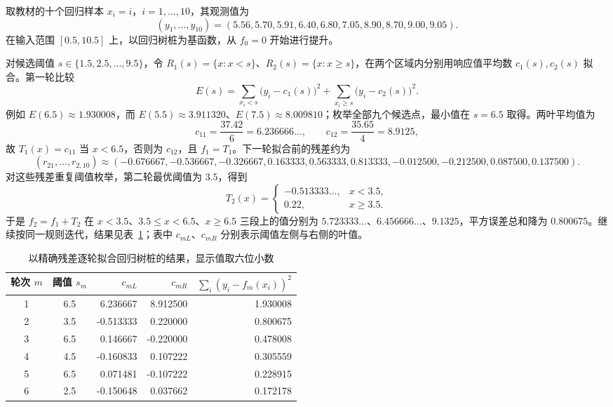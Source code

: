 \begin{example}
\label{ex:lh-boost-regression}
取教材的十个回归样本 $x_i=i$，$i=1,\ldots,10$，其观测值为
\[
 (y_1,\ldots,y_{10})=(5.56,5.70,5.91,6.40,6.80,7.05,8.90,8.70,9.00,9.05).
\]
在输入范围 $[0.5,10.5]$ 上，以回归树桩为基函数，从 $f_0=0$ 开始进行提升。
\end{example}
\begin{solve}
对候选阈值 $s\in\{1.5,2.5,\ldots,9.5\}$，令 $R_1(s)=\{x:x<s\}$、$R_2(s)=\{x:x\geq s\}$，在两个区域内分别用响应值平均数 $c_1(s),c_2(s)$ 拟合。第一轮比较
\[
 E(s)=\sum_{x_i<s}\bigl(y_i-c_1(s)\bigr)^2
      +\sum_{x_i\geq s}\bigl(y_i-c_2(s)\bigr)^2.
\]
例如 $E(6.5)\approx1.930008$，而 $E(5.5)\approx3.911320$、$E(7.5)\approx8.009810$；枚举全部九个候选点，最小值在 $s=6.5$ 取得。两叶平均值为
\[
 c_{11}=\frac{37.42}{6}=6.236666\ldots,\qquad
 c_{12}=\frac{35.65}{4}=8.9125,
\]
故 $T_1(x)=c_{11}$ 当 $x<6.5$，否则为 $c_{12}$，且 $f_1=T_1$。下一轮拟合前的残差约为
\[
 (r_{21},\ldots,r_{2,10})\approx
 (-0.676667,-0.536667,-0.326667,0.163333,0.563333,0.813333,
 -0.012500,-0.212500,0.087500,0.137500).
\]
对这些残差重复阈值枚举，第二轮最优阈值为 $3.5$，得到
\[
 T_2(x)=\begin{cases}-0.513333\ldots,&x<3.5,\\0.22,&x\geq3.5.\end{cases}
\]
于是 $f_2=f_1+T_2$ 在 $x<3.5$、$3.5\leq x<6.5$、$x\geq6.5$ 三段上的值分别为 $5.723333\ldots$、$6.456666\ldots$、$9.1325$，平方误差总和降为 $0.800675$。继续按同一规则迭代，结果见表~\ref{tab:lh-boost-regression-rounds}；表中 $c_{mL}$、$c_{mR}$ 分别表示阈值左侧与右侧的叶值。
\begin{table}[htbp]
 \centering
 \caption{以精确残差逐轮拟合回归树桩的结果，显示值取六位小数}
 \label{tab:lh-boost-regression-rounds}
 \begin{tabular}{ccrrr}
  \toprule
  轮次 $m$ & 阈值 $s_m$ & $c_{mL}$ & $c_{mR}$ & $\sum_i(y_i-f_m(x_i))^2$\\
  \midrule
  1 & 6.5 & 6.236667 & 8.912500 & 1.930008\\
  2 & 3.5 & -0.513333 & 0.220000 & 0.800675\\
  3 & 6.5 & 0.146667 & -0.220000 & 0.478008\\
  4 & 4.5 & -0.160833 & 0.107222 & 0.305559\\
  5 & 6.5 & 0.071481 & -0.107222 & 0.228915\\
  6 & 2.5 & -0.150648 & 0.037662 & 0.172178\\
  \bottomrule
 \end{tabular}
\end{table}


\end{solve}
